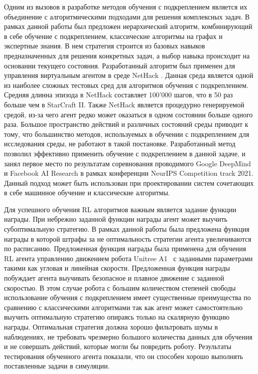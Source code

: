 Одним из вызовов в разработке методов обучения с подкреплением является их объединение с алгоритмическими подходами для решения комплексных задач. В рамках данной работы был предложен иерархический алгоритм, комбинирующий в себе обучение с подкреплением, классические алгоритмы на графах и экспертные знания. В нем стратегия строится из базовых навыков предназначенных для решения конкретных задач, а выбор навыка происходит на основании текущего состояния. 
Разработанный алгоритм был применен для управления виртуальным агентом в среде NetHack \cite{nethack}. Данная среда является одной из наиболее сложных тестовых сред для алгоритмов обучения с подкреплением. Средняя длинна эпизода в NetHack составляет 100'000 шагов, что в 50 раз больше чем в StarCraft II. Также NetHack является процедурно генерируемой средой, из-за чего агент редко может оказаться в одном состоянии больше одного раза. Большое пространство действий и различных состояний среды приводит к тому, что большинство методов, используемых в обучении с подкреплением для исследования среды, не работают в такой постановке. Разработанный метод позволил эффективно применить обучение с подкреплением в данной задаче, и занял первое место по результатам соревнования проводимого Google DeepMind и Facebook AI Research в рамках конференции NeurIPS Competition track 2021. Данный подход может быть использован при проектировании систем сочетающих в себе машинное обучение и классические алгоритмы. 

Для успешного обучения RL алгоритмов важным является задание функции награды. При небрежно заданной функции награды агент может выучить субоптимальную стратегию. В рамках данной работы была предложена функция награды в которой штрафы за не оптимальность стратегии агента увеличиваются по расписанию. Предложенная функция награды была применена для обучения RL агента управлению движением робота Unitree A1~\cite{unitree} с заданными параметрами такими как угловая и линейная скорости. Предложенная функция награды побуждает агента выучивать безопасное и плавное движение с заданной скоростью. В этом случае робота с большим количеством степеней свободы использование обучения с подкреплением имеет существенные преимущества по сравнению с классическими алгоритмами так как агент может самостоятельно выучить оптимальную стратегию опираясь только на скалярную функцию награды. Оптимальная стратегия должна хорошо фильтровать шумы в наблюдениях, не требовать чрезмерно большого количества данных для обучения и не совершать действий, которые могли бы повредить роботу. Результаты тестирования обученного агента показали, что он способен хорошо выполнять поставленные задачи в симуляции.


